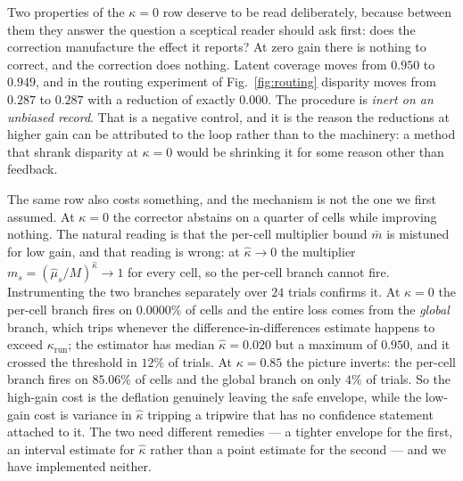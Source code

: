 \documentclass[journal,10pt,twocolumn]{IEEEtran}
\begin{document}
Two properties of the $\kappa = 0$ row deserve to be read deliberately, because
between them they answer the question a sceptical reader should ask first: does the
correction manufacture the effect it reports? At zero gain there is nothing to
correct, and the correction does nothing. Latent coverage moves from $0.950$ to
$0.949$, and in the routing experiment of Fig.~\ref{fig:routing} disparity moves
from $0.287$ to $0.287$ with a reduction of exactly $0.000$. The procedure is
\emph{inert on an unbiased record}. That is a negative control, and it is the
reason the reductions at higher gain can be attributed to the loop rather than to
the machinery: a method that shrank disparity at $\kappa = 0$ would be shrinking it
for some reason other than feedback.

The same row also costs something, and the mechanism is not the one we first
assumed. At $\kappa = 0$ the corrector abstains on a quarter of cells while
improving nothing. The natural reading is that the per-cell multiplier bound
$\bar{m}$ is mistuned for low gain, and that reading is wrong: at
$\hat\kappa \to 0$ the multiplier $m_s = (\hat\mu_s/M)^{\hat\kappa} \to 1$ for
every cell, so the per-cell branch cannot fire. Instrumenting the two branches
separately over $24$ trials confirms it. At $\kappa = 0$ the per-cell branch fires
on $0.0000\%$ of cells and the entire loss comes from the \emph{global} branch,
which trips whenever the difference-in-differences estimate happens to exceed
$\kappa_{\mathrm{run}}$; the estimator has median $\hat\kappa = 0.020$ but a
maximum of $0.950$, and it crossed the threshold in $12\%$ of trials. At
$\kappa = 0.85$ the picture inverts: the per-cell branch fires on $85.06\%$ of
cells and the global branch on only $4\%$ of trials. So the high-gain cost is the
deflation genuinely leaving the safe envelope, while the low-gain cost is variance
in $\hat\kappa$ tripping a tripwire that has no confidence statement attached to
it. The two need different remedies --- a tighter envelope for the first, an
interval estimate for $\hat\kappa$ rather than a point estimate for the second ---
and we have implemented neither.
\end{document}
